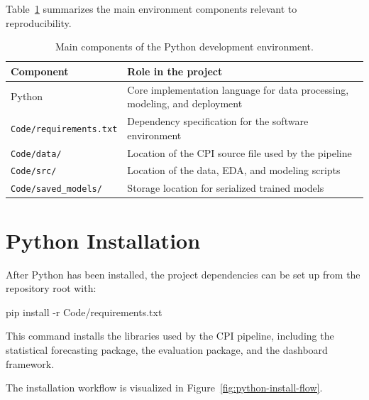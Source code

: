 Table~\ref{tab:python-environment-summary} summarizes the main environment components relevant to reproducibility.

\begin{table}[htbp]
	\centering
	\caption{Main components of the Python development environment.}
	\label{tab:python-environment-summary}
	\begin{tabular}{p{4cm}p{9cm}}
		\hline
		Component & Role in the project \\
		\hline
		Python & Core implementation language for data processing, modeling, and deployment \\
		\texttt{Code/requirements.txt} & Dependency specification for the software environment \\
		\texttt{Code/data/} & Location of the CPI source file used by the pipeline \\
		\texttt{Code/src/} & Location of the data, EDA, and modeling scripts \\
		\texttt{Code/saved\_models/} & Storage location for serialized trained models \\
		\hline
	\end{tabular}
\end{table}

\section{Python Installation}

After Python has been installed, the project dependencies can be set up from the repository root with:

\begin{Python}[caption={Installing the project environment}, label={lst:python-install-project}]
	pip install -r Code/requirements.txt
\end{Python}

This command installs the libraries used by the CPI pipeline, including the statistical forecasting package, the evaluation package, and the dashboard framework.

The installation workflow is visualized in Figure~\ref{fig:python-install-flow}.

